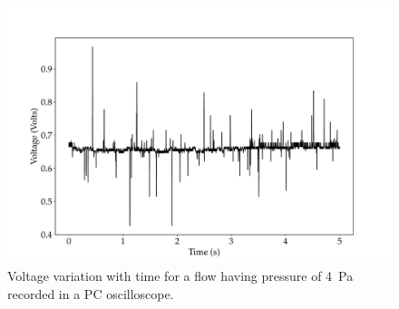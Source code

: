 \begin{figure}
    \centering
    \includegraphics[width=\linewidth]{gfx/Voltage_vs_time_for_4Pa.pdf}
    \caption{Voltage variation with time for a flow having pressure of 4~Pa recorded in a PC oscilloscope.}
    \label{fig:V_t_calib bulb 4 Pa}
\end{figure}

